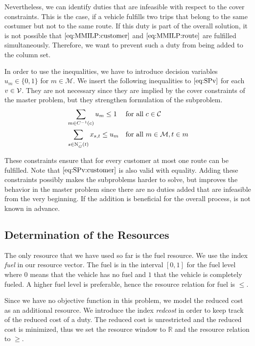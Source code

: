 Nevertheless, we can identify duties that are infeasible with respect to the cover constraints. This is the case, if a vehicle fulfills two trips that belong to the same costumer but not to the same route. If this duty is part of the overall solution, it is not possible that $\eqref{eq:MMILP:customer}$ and $\eqref{eq:MMILP:route}$ are fulfilled simultaneously. Therefore, we want to prevent such a duty from being added to the column set.

In order to use the inequalities, we have to introduce decision variables $u_m\in\{0,1\}$ for $m\in\mathcal{M}$. We insert the following inequalities to $\eqref{eq:SPv}$ for each $v\in\mathcal{V}$. They are not necessary since they are implied by the cover constraints of the master problem, but they strengthen formulation of the subproblem.
\begin{align}
	& \sum_{m\in C^{-1}(c)} u_m \leq 1 && \text{for all } c\in\mathcal{C} \label{eq:SPv:customer} \\
	& \sum_{s\in\operatorname{N}_G^-(t)} x_{s,t} \leq u_m && \text{for all } m\in\mathcal{M}, t\in m \label{eq:SPv:route} \\
\end{align}

These constraints ensure that for every customer at most one route can be fulfilled. Note that $\eqref{eq:SPv:customer}$ is also valid with equality. Adding these constraints possibly makes the subproblems harder to solve, but improves the behavior in the master problem since there are no duties added that are infeasible from the very beginning. If the addition is beneficial for the overall process, is not known in advance.


\subsection{Determination of the Resources}

The only resource that we have used so far is the fuel resource. We use the index \emph{fuel} in our resource vector. The fuel is in the interval $[0,1]$ for the fuel level where $0$ means that the vehicle has no fuel and $1$ that the vehicle is completely fueled. A higher fuel level is preferable, hence the resource relation for fuel is $\leq$.

Since we have no objective function in this problem, we model the reduced cost as an additional resource. We introduce the index \emph{redcost} in order to keep track of the reduced cost of a duty. The reduced cost is unrestricted and the reduced cost is minimized, thus we set the resource window to $\mathbb{R}$ and the resource relation to $\geq$.

